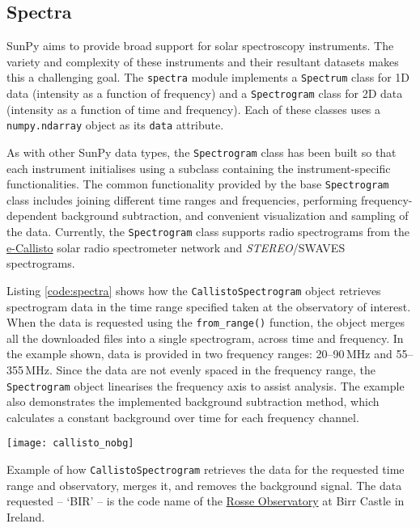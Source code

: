 \subsection{Spectra}\label{sec:spectra}
SunPy aims to provide broad support for solar spectroscopy
instruments.  The variety and complexity of these instruments and
their resultant datasets makes this a challenging goal.  The \texttt{spectra} module implements a
\texttt{Spectrum} class for 1D data (intensity as a function of frequency) and a
\texttt{Spectrogram} class for 2D data (intensity as a function of time and
frequency).  Each of these classes uses a \texttt{numpy.ndarray} object
as its \texttt{data} attribute.  

As with other SunPy data types, the \texttt{Spectrogram} class has been
built so that each instrument initialises using a subclass containing the instrument-specific 
functionalities. The common functionality provided by the base \texttt{Spectrogram} class includes
joining different time ranges and frequencies, performing frequency-dependent background subtraction,
and convenient visualization and sampling of the data.
Currently, the \texttt{Spectrogram} class supports radio spectrograms from the 
\href{http://www.e-callisto.org/}{e-Callisto}
solar radio spectrometer network and \textit{STEREO}/SWAVES spectrograms.

Listing \ref{code:spectra} shows how the \texttt{CallistoSpectrogram}
object retrieves spectrogram data in the time range specified taken at
the observatory of interest.  When the data is requested using the
\texttt{from\_range()} function, the object merges all the downloaded
files into a single spectrogram, across time and frequency.
In the example shown, data is provided in two frequency ranges:
20--90\,MHz and 55--355\,MHz.  Since the data are not evenly spaced in
the frequency range, the \texttt{Spectrogram} object linearises the
frequency axis to assist analysis.  The example also demonstrates
the implemented background subtraction method, which calculates
a constant background over time for each frequency channel.

\begin{listing}[H]
\begin{center}
\texttt{[image: callisto\_nobg]}
\end{center}
\caption{Example of how \texttt{CallistoSpectrogram} retrieves the
  data for the requested time range and observatory, merges it, and
  removes the background signal.  The data requested -- `BIR' -- is
  the code name of the \href{http://www.rosseobservatory.ie}{Rosse Observatory}
  at Birr Castle in Ireland.}
\label{code:spectra}
\end{listing}

